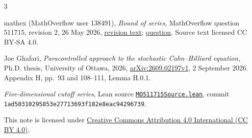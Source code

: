 \documentclass[11pt]{article}
\newcommand{\leanfile}{\href{https://github.com/the-omega-institute/trureturing/blob/1ad50310295853e27713693f182e8eac94296739/D5/S3/Fourier/MO511715Source.lean}{\texttt{MO511715Source.lean}}}
\begin{document}
\begin{thebibliography}{3}
\raggedright
{}
mathex (MathOverflow user 138491),
\emph{Bound of series}, MathOverflow question 511715,
revision 2, 26 May 2026,
\href{https://mathoverflow.net/revisions/511715/2}{revision text};
\href{https://mathoverflow.net/questions/511715/bound-of-series}{question}.
Source text licensed CC BY-SA 4.0.

Joe Ghafari, \emph{Paracontrolled approach to the stochastic Cahn--Hilliard
equation}, Ph.D. thesis, University of Ottawa, 2026,
\href{https://arxiv.org/abs/2609.02197v1}{arXiv:2609.02197v1},
2 September 2026. Appendix H, pp.~93 and 108--111, Lemma H.0.1.

\emph{Five-dimensional cutoff series}, Lean source
\leanfile, commit
\texttt{1ad50310295853e27713693f182e8eac94296739}.
\end{thebibliography}

\smallskip
\noindent\small This note is licensed under
\href{https://creativecommons.org/licenses/by/4.0/}{Creative Commons Attribution 4.0
International (CC BY 4.0)}.
\end{document}

